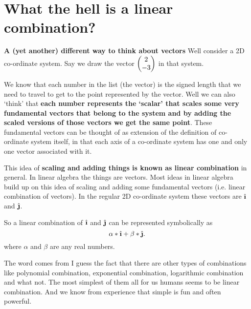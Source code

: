 \documentclass[../main.tex]{subfiles}
\begin{document}
\section{What the hell is a linear combination?}

\textbf{A (yet another) different way to think about vectors}
Well consider a 2D co-ordinate system. Say we draw the vector $ \blockcomment{Column-Vector: 2, -3} \begin{pmatrix} 2 \\  -3 \end{pmatrix} $ in that system.

\begin{figure}[h]
  \centering
\end{figure}

We know that each number in the list (the vector) is the signed length that we need to travel to get to the point represented by the vector.
Well we can also `think' that \textbf{each number represents the `scalar' that scales some very fundamental vectors that belong to the system and by adding the scaled versions of those vectors we get the same point}. These fundamental vectors can be thought of as extension of the definition of co-ordinate system itself, in that each axis of a co-ordinate system has one and only one vector associated with it.

This idea of \textbf{scaling and adding things is known as linear combination} in general. In linear algebra the things are vectors. Most ideas in linear algebra build up on this idea of scaling and adding some fundamental vectors (i.e. linear combination of vectors). In the regular 2D co-ordinate system these vectors are $ \ihat $ and $ \jhat $.

So a linear combination of $ \ihat $ and $ \jhat $ can be represented symbolically as \[
\alpha * \ihat + \beta * \jhat
.\] where $ \alpha $ and $ \beta $ are any real numbers.

The word comes from I guess the fact that there are other types of combinations like polynomial combination, exponential combination, logarithmic combination and what not. The most simplest of them all for us humans seems to be linear combination. And we know from experience that simple is fun and often powerful.

\pagebreak
\end{document}
